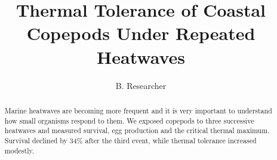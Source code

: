 \documentclass[11pt]{article}
\title{Thermal Tolerance of Coastal Copepods Under Repeated Heatwaves}
\author{B. Researcher}
\date{}
\begin{document}
\maketitle

\begin{abstract}
Marine heatwaves are becoming more frequent and it is very important to understand how small organisms respond to them.
We exposed copepods to three successive heatwaves and measured survival, egg production and the critical thermal maximum.
Survival declined by 34\% after the third event, while thermal tolerance increased modestly.
\end{abstract}






\end{document}
